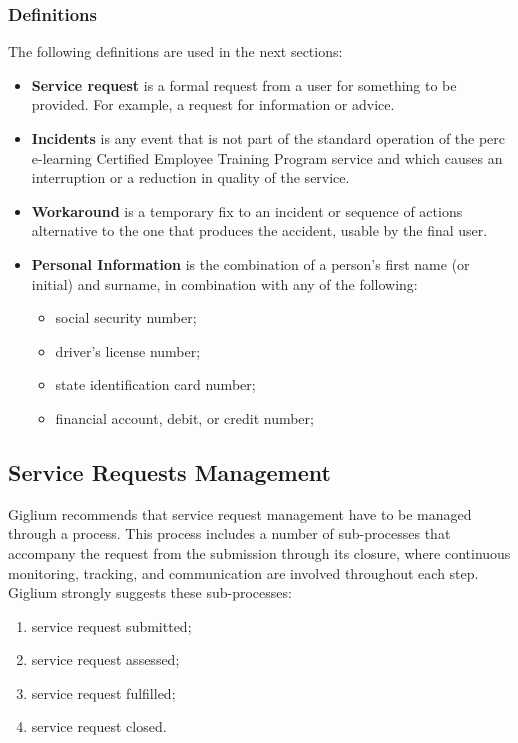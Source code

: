 \subsubsection{Definitions}
The following definitions are used in the next sections:
\begin{itemize}
	\item \textbf{Service request} is a formal request from a user for something to be provided. For example, a request for information or advice.	
	
	\item \textbf{Incidents} is any event that is not part of the standard operation of the \gls{perc} e-learning Certified Employee Training Program service and which causes an interruption or a reduction in quality of the service.
	
	\item \textbf{Workaround} is a temporary fix to an incident or sequence of actions alternative to the one that produces the accident, usable by the final user.
	
	\item \textbf{Personal Information} is the combination of a person’s first name (or initial) and surname, in combination with any of the following:
	\begin{itemize}
		\item social security number;
		\item driver’s license number;
		\item state identification card number;
		\item financial account, debit, or credit number;
	\end{itemize}
\end{itemize}

\subsection{Service Requests Management}
Giglium recommends that service request management have to be managed through a process. This process includes a number of sub-processes that accompany the request from the submission through its closure, where continuous monitoring, tracking, and communication are involved throughout each step. Giglium strongly suggests these sub-processes:
\begin{enumerate}
	\item service request submitted;
	\item service request assessed;
	\item service request fulfilled;
	\item service request closed.
\end{enumerate}

